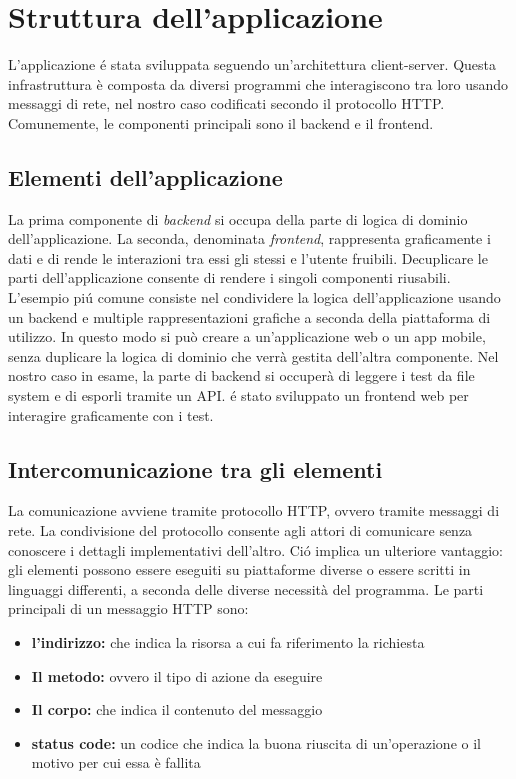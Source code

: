 \chapter{Struttura dell'applicazione}
    L'applicazione \'e stata sviluppata seguendo un'architettura client-server.
    Questa infrastruttura è composta da diversi programmi che interagiscono tra loro usando messaggi di rete, nel nostro caso codificati secondo il protocollo HTTP.
    Comunemente, le componenti principali sono il backend e il frontend.    

    \section{Elementi dell'applicazione}
        La prima componente di \textit{backend} si occupa della parte di logica di dominio dell'applicazione.
        La seconda, denominata \textit{frontend}, rappresenta graficamente i dati e di rende le interazioni tra essi gli stessi e l'utente fruibili.
        Decuplicare le parti dell'applicazione consente di rendere i singoli componenti riusabili.
        L'esempio pi\'u comune consiste nel condividere la logica dell'applicazione usando un backend e multiple rappresentazioni grafiche a seconda della piattaforma di utilizzo.
        In questo modo si può creare a un'applicazione web o un app mobile, senza duplicare la logica di dominio che verrà gestita dell'altra componente.
        Nel nostro caso in esame, la parte di backend si occuperà di leggere i test da file system e di esporli tramite un API.
        \'e stato sviluppato un frontend web per interagire graficamente con i test.

    \section{Intercomunicazione tra gli elementi}
        La comunicazione avviene tramite protocollo HTTP, ovvero tramite messaggi di rete.
        La condivisione del protocollo consente agli attori di comunicare senza conoscere i dettagli implementativi dell'altro.
        Ci\'o implica un ulteriore vantaggio: gli elementi possono essere eseguiti su piattaforme diverse o essere scritti in linguaggi differenti, a seconda delle diverse necessità del programma.
        Le parti principali di un messaggio HTTP sono:
        \begin{itemize}
            \item \textbf{l’indirizzo:} che indica la risorsa a cui fa riferimento la richiesta
            \item \textbf{Il metodo:} ovvero il tipo di azione da eseguire 
            \item \textbf{Il corpo:} che indica il contenuto del messaggio
            \item \textbf{status code:} un codice che indica la buona riuscita di un'operazione o il motivo per cui essa è fallita 
        \end{itemize}

